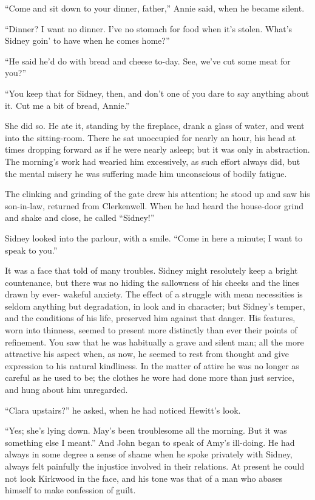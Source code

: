 {} ``Come and sit down to your dinner, father,'' Annie said, when he
became silent.

``Dinner? I want no dinner. I've no stomach for food when it's stolen.
What's Sidney goin' to have when he comes home?''

``He said he'd do with bread and cheese to-day. See, we've cut some meat
for you?''

``You keep that for Sidney, then, and don't one of you dare to say
anything about it. Cut me a bit of bread, Annie.''

She did so. He ate it, standing by the fireplace, drank a glass of
water, and went into the sitting-room. There he sat unoccupied for
nearly an hour, his head at times dropping forward as if he were nearly
asleep; but it was only in abstraction. The morning's work had wearied
him excessively, as such effort always did, but the mental misery he was
suffering made him unconscious of bodily fatigue.

The clinking and grinding of the gate drew his attention; he stood up
and saw his son-in-law, returned from Clerkenwell. When he had heard the
house-door grind and shake and close, he called ``Sidney!''

Sidney looked into the parlour, with a smile. {} ``Come in here a
minute; I want to speak to you.''

It was a face that told of many troubles. Sidney might resolutely keep a
bright countenance, but there was no hiding the sallowness of his cheeks
and the lines drawn by ever- wakeful anxiety. The effect of a struggle
with mean necessities is seldom anything but degradation, in look and in
character; but Sidney's temper, and the conditions of his life,
preserved him against that danger. His features, worn into thinness,
seemed to present more distinctly than ever their points of refinement.
You saw that he was habitually a grave and silent man; all the more
attractive his aspect when, as now, he seemed to rest from thought and
give expression to his natural kindliness. In the matter of attire he
was no longer as careful as he used to be; the clothes he wore had done
more than just service, and hung about him unregarded.

``Clara upstairs?'' he asked, when he had noticed Hewitt's look.

``Yes; she's lying down. May's been troublesome all the morning. But it
was something else I meant.'' {} And John began to speak of Amy's
ill-doing. He had always in some degree a sense of shame when he spoke
privately with Sidney, always felt painfully the injustice involved in
their relations. At present he could not look Kirkwood in the face, and
his tone was that of a man who abases himself to make confession of
guilt.

